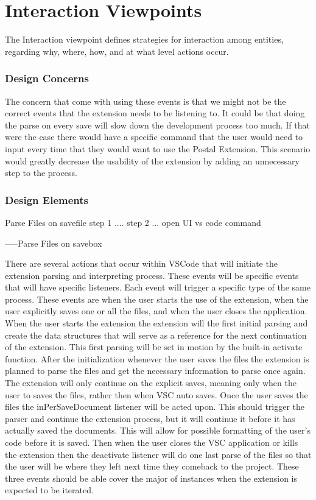 \documentclass[letterpaper,10pt,titlepage,draftclsnofoot,onecolumn,onesided] {IEEEtran}
\begin{document}
\section{Interaction Viewpoints}
The Interaction viewpoint defines strategies for interaction among entities, regarding why, where, how, and
at what level actions occur. 
\subsubsection{Design Concerns}
The concern that come with using these events is that we might not be the correct events that the extension needs to be listening to. 
It could be that doing the parse on every save will slow down the development process too much. 
If that were the case there would have a specific command that the user would need to input every time that they would want to use the Postal Extension.
This scenario would greatly decrease the usability of the extension by adding an unnecessary step to the process.

\subsubsection{Design Elements}

	Parse Files on savefile
		step 1 ....
		step 2 ...
	open UI vs code command

	-----Parse Files on savebox
	
There are several actions that occur within VSCode that will initiate the extension parsing and interpreting process.
These events will be specific events that will have specific listeners. 
Each event will trigger a specific type of the same process.
These events are when the user starts the use of the extension, when the user explicitly saves one or all the files, and when the user closes the application.
When the user starts the extension the extension will the first initial parsing and create the data structures that will serve as a reference for the next continuation of the extension.
This first parsing will be set in motion by the built-in activate function. 
After the initialization whenever the user saves the files the extension is planned to parse the files and get the necessary information to parse once again. 
The extension will only continue on the explicit saves, meaning only when the user to saves the files, rather then when VSC auto saves. 
Once the user saves the files the inPerSaveDocument listener will be acted upon.
This should trigger the parser and continue the extension process, but it will continue it before it has actually saved the documents. 
This will allow for possible formatting of the user's code before it is saved.
Then when the user closes the VSC application or kills the extension then the deactivate listener will do one last parse of the files so that the user will be where they left next time they comeback to the project.
These three events should be able cover the major of instances when the extension is expected to be iterated.
\end{document}
